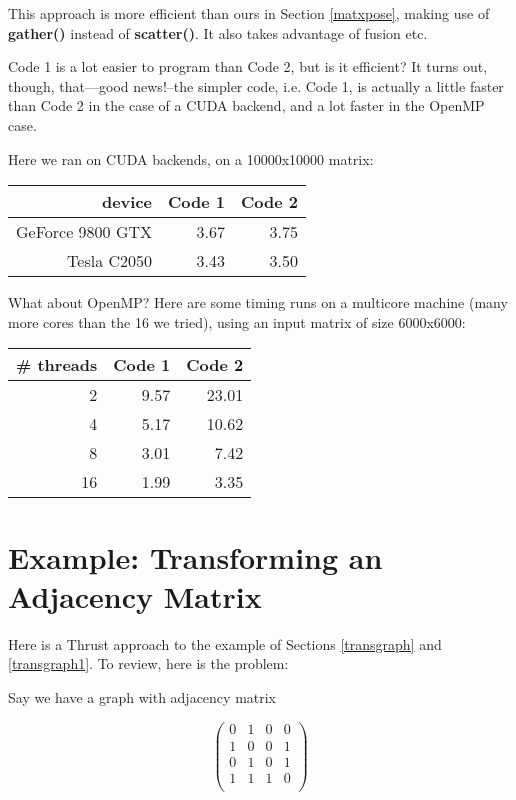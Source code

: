 This approach is more efficient than ours in Section \ref{matxpose},
making use of {\bf gather()} instead of {\bf scatter()}.  It also takes
advantage of fusion etc.

Code 1 is a lot easier to program than Code 2, but is it efficient?
It turns out, though, that---good news!--the simpler code, i.e. Code 1,
is actually a little faster than Code 2 in the case of a CUDA backend,
and a lot faster in the OpenMP case.

Here we ran on CUDA backends, on a 10000x10000 matrix:

\begin{tabular}{|r|r|r|}
\hline
device & Code 1 & Code 2 \\ \hline 
GeForce 9800 GTX & 3.67 & 3.75 \\ \hline 
Tesla C2050 & 3.43 & 3.50 \\ \hline 
\end{tabular}

What about OpenMP?  Here are some timing runs on a multicore machine
(many more cores than the 16 we tried), using an input matrix of size
6000x6000:

\begin{tabular}{|r|r||r|}
\hline
\# threads & Code 1 & Code 2 \\ \hline 
2 & 9.57 & 23.01 \\ \hline 
4 & 5.17 & 10.62 \\ \hline 
8 & 3.01 & 7.42 \\ \hline 
16 & 1.99 & 3.35 \\ \hline 
\hline
\end{tabular}

\section{Example:  Transforming an Adjacency Matrix}

Here is a Thrust approach to the example of Sections \ref{transgraph}
and \ref{transgraph1}.  To review, here is the problem:

Say we have a graph with adjacency matrix

\begin{equation}
\left (
\begin{array}{rrrr}
0 & 1 & 0 & 0 \\
1 & 0 & 0 & 1 \\
0 & 1 & 0 & 1 \\
1 & 1 & 1 & 0 \\
\end{array}
\right )
\end{equation}

